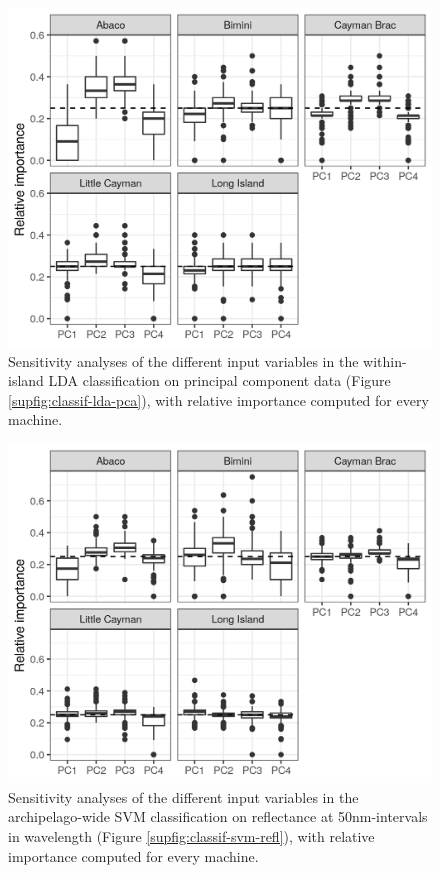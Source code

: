 \begin{figure}[H]
	\centering
	\includegraphics[width=\textwidth]{"../analyses/04-machine learning/plots/importance_lda_pca"}
	\caption{Sensitivity analyses of the different input variables in the within-island LDA classification on principal component data (Figure \ref{supfig:classif-lda-pca}), with relative importance computed for every machine.}
	\label{supfig:importance-lda-pca}
\end{figure}

\begin{figure}[H]
	\centering
	\includegraphics[width=\textwidth]{"../analyses/04-machine learning/plots/importance_svm_pca"}
	\caption{Sensitivity analyses of the different input variables in the archipelago-wide SVM classification on reflectance at 50nm-intervals in wavelength (Figure \ref{supfig:classif-svm-refl}), with relative importance computed for every machine.}
	\label{supfig:importance-svm-refl}
\end{figure}


